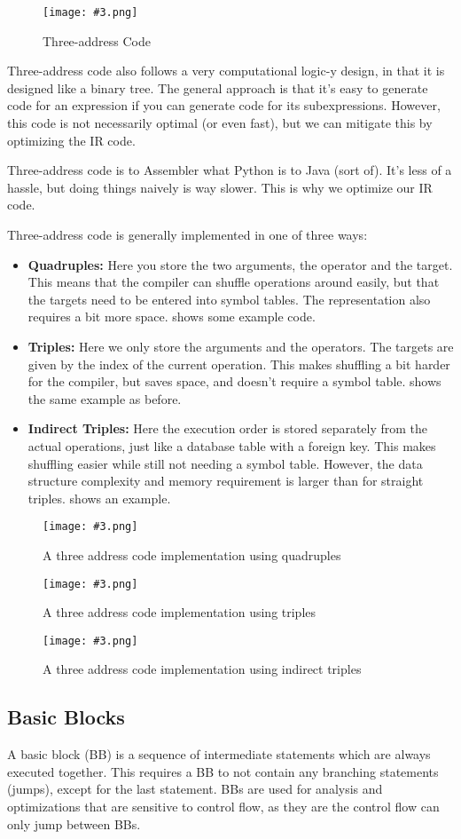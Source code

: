 \documentclass{article}
\newcommand{\fig}[4]{
	\begin{figure}[#1]
		\center
		\texttt{[image: \#3.png]}
		\caption{#4}
		\label{fig:#3}
	\end{figure}
	}
\begin{document}
\fig{h}{}{tac}{Three-address Code}

Three-address code also follows a very computational logic-y design, in that it is designed like a binary tree.
The general approach is that it's easy to generate code for an expression if you can generate code for its subexpressions.
However, this code is not necessarily optimal (or even fast), but we can mitigate this by optimizing the IR code.

\begin{keypointbox}
	Three-address code is to Assembler what Python is to Java (sort of).
	It's less of a hassle, but doing things naively is way slower.
	This is why we optimize our IR code.
\end{keypointbox}

Three-address code is generally implemented in one of three ways:
\begin{itemize}
	\item \textbf{Quadruples:} Here you store the two arguments, the operator and the target.
		This means that the compiler can shuffle operations around easily, but that the targets need to be entered into symbol tables.
		The representation also requires a bit more space.
		 shows some example code.
	\item \textbf{Triples:} Here we only store the arguments and the operators.
		The targets are given by the index of the current operation.
		This makes shuffling a bit harder for the compiler, but saves space, and doesn't require a symbol table.
		 shows the same example as before.
	\item \textbf{Indirect Triples:} Here the execution order is stored separately from the actual operations, just like a database table with a foreign key.
		This makes shuffling easier while still not needing a symbol table.
		However, the data structure complexity and memory requirement is larger than for straight triples.
		 shows an example.
\end{itemize}

\fig{h}{}{quadruples}{A three address code implementation using quadruples}
\fig{h}{}{triples}{A three address code implementation using triples}
\fig{h}{}{indirect}{A three address code implementation using indirect triples}

\subsection{Basic Blocks}
A basic block (BB) is a sequence of intermediate statements which are always executed together.
This requires a BB to not contain any branching statements (jumps), except for the last statement.
BBs are used for analysis and optimizations that are sensitive to control flow, as they are the control flow can only jump between BBs.
\end{document}
